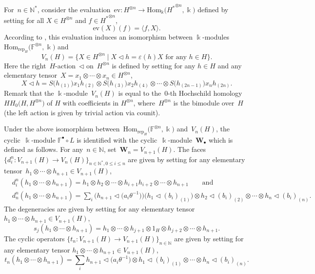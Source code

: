 \documentclass[10pt,a4paper]{amsart}
\numberwithin{equation}{section}
\newcommand{\co}{\colon}
\newcommand{\tens}{\otimes}
\newcommand{\N}{\mathbb{N}}
\newcommand{\Hom}{\mathrm{Hom}}
\newcommand{\kk}{\Bbbk}
\newcommand{\coend}{\mathbb{F}}
\newcommand{\rep}[1]{\text{rep}_{#1}}
\newcommand{\ltrn}{\triangleleft}
\begin{document}
For~$n\in \N^*$, consider the evaluation~$\text{ev}\co H^{\tens n} \to \Hom_\kk\bigl({{H^{*}}^{\tens n}}, \kk\bigr)$ defined by setting for all $X\in H^{\tens n}$ and $f \in {{H^{*}}^{\tens n}}$,
\[
\text{ev}(X)(f)=\langle f,X \rangle.
\]
According to \cite[Lemma 4.5\,$(d)$]{virelizier_2006}, this evaluation induces an isomorphism between $\kk$-modules $\Hom_{\rep{H}}\bigl(\coend^{\tens n}, \kk\bigr)$ and
\[
V_n(H) = \bigl\{X \in H^{\tens n} \mid X\ltrn h = \varepsilon(h)X \text{ for any } h\in H\bigr\}.
\]
Here the right~$H$-action~$\ltrn$ on~$H^{\tens n}$ is defined by setting for any $h\in H$ and any elementary tensor~$X=x_1\tens \cdots \tens x_n \in H^{\tens n}$,
\[
X\ltrn h = S\bigl(h_{(1)}\bigr)x_1h_{(2)} \tens S\bigl(h_{(3)}\bigr)x_2h_{(4)}\tens \cdots \tens S\bigl(h_{(2n-1)}\bigr)x_nh_{(2n)}.
\]
Remark that the $\kk$-module~$V_n(H)$ is equal to the~$0$-th Hochschild homology $HH_0\bigl(H, H^{\tens n}\bigr)$ of $H$ with coefficients in $H^{\tens n}$, where~$H^{\tens n}$ is the bimodule over~$H$ (the left action is given by trivial action via counit).

Under the above isomorphism between~$\Hom_{\rep{H}}\bigl(\coend^{\tens n}, \kk\bigr)$ and~$V_n(H)$, the cyclic~$\kk$-module $\coend^\bullet\circ L$ is identified with the cyclic~$\kk$-module~$\textbf{W}_\bullet$ which is defined as follows. For any~$n\in \N$, set~$\textbf{W}_n=V_{n+1}(H)$.
The faces~$\{d_i^n \co V_{n+1}(H) \to V_{n}(H)\}_{n \in \N^*, 0\le i \le n}$ are given by setting for any elementary tensor~$h_1\otimes\cdots\otimes h_{n+1} \in V_{n+1}(H)$,
\begin{align*}
	&d_i^n(h_1\otimes\cdots\otimes h_{n+1})=
	h_1\otimes h_2\otimes\cdots \otimes h_{i+1}h_{i+2}\otimes\cdots \otimes h_{n+1} \qquad \text{and} \\
	&d_n^n(h_1\otimes \cdots\otimes h_{n+1})=\sum_i\bigl(h_{n+1}\ltrn \bigl(a_i\theta^{-1}\bigr)\bigr)\bigl(h_1\ltrn (b_i)_{(1)}\bigr)\otimes h_2\ltrn (b_i)_{(2)}\otimes \cdots\otimes h_n\ltrn (b_i)_{(n)}.
\end{align*}
The degeneracies \smash{$\bigl\{s_j^n \co V_{n+1}(H) \to V_{n+2}(H)\bigr\}_{n\in \N, 0\le j \le n}$} are given by setting for any elementary tensor $h_1\otimes\cdots\otimes h_{n+1} \in V_{n+1}(H)$,
\[
s_j(h_1\otimes \cdots\otimes h_{n+1})=
	h_1\otimes\cdots\otimes h_{j+1}\otimes 1_H\otimes h_{j+2}\otimes \cdots \otimes h_{n+1}.
\]
The cyclic operators $\{t_n \co V_{n+1}(H) \to V_{n+1}(H)\}_{n\in \N}$ are given by setting for any elementary tensor $h_1\otimes\cdots\otimes h_{n+1} \in V_{n+1}(H)$,
\[
t_n(h_1\tens \cdots \tens h_{n+1})= \sum_i h_{n+1}\ltrn \bigl(a_i\theta^{-1}\bigr)\tens h_1\ltrn (b_i)_{(1)} \otimes \cdots\otimes h_n\ltrn (b_i)_{(n)}.\]
\end{document}
